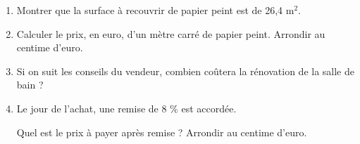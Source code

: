 \documentclass[exercice,a4]{thedocument}%
\begin{document}
	\begin{enumerate}
		\item Montrer que la surface à recouvrir de papier peint est de 26,4 m$^2$.

		\item Calculer le prix, en euro, d’un mètre carré de papier peint.
		Arrondir au centime d'euro.

		\item Si on suit les conseils du vendeur, combien coûtera la rénovation de la salle de bain ?

		\item Le jour de l'achat, une remise de 8 \% est accordée.

Quel est le prix à payer après remise ? Arrondir au centime d'euro.
	\end{enumerate}

\showthesource
\end{document}

